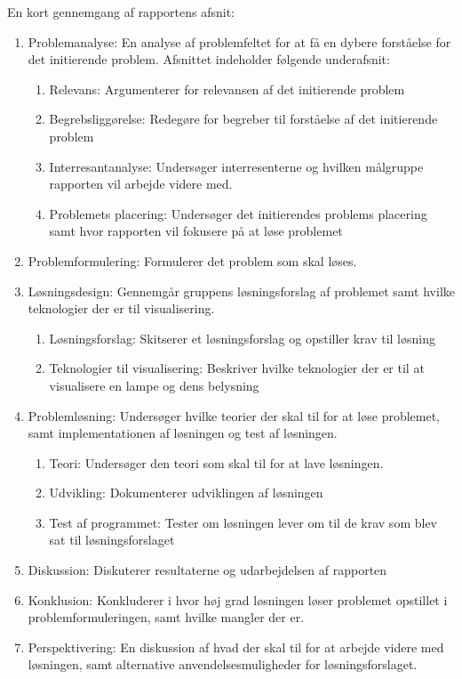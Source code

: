 En kort gennemgang af rapportens afsnit:
\begin{enumerate}
\item Problemanalyse: En analyse af problemfeltet for at få en dybere forståelse for det initierende problem. Afsnittet indeholder følgende underafsnit:
  \begin{enumerate}
    \item Relevans: Argumenterer for relevansen af det initierende problem
    \item Begrebsliggørelse: Redegøre for begreber til forståelse af det initierende problem
    \item Interresantanalyse: Undersøger interresenterne og hvilken målgruppe rapporten vil arbejde videre med.
    \item Problemets placering: Undersøger det initierendes problems placering samt hvor rapporten vil fokusere på at løse problemet
  \end{enumerate}
\item Problemformulering: Formulerer det problem som skal løses.
\item Løsningsdesign: Gennemgår gruppens løsningsforslag af problemet samt hvilke teknologier der er til visualisering.
  \begin{enumerate}
    \item Løsningsforslag: Skitserer et løsningsforslag og opstiller krav til løsning
    \item Teknologier til visualisering: Beskriver hvilke teknologier der er til at visualisere en lampe og dens belysning
  \end{enumerate}
\item Problemløsning: Undersøger hvilke teorier der skal til for at løse problemet, samt implementationen af løsningen og test af løsningen.
  \begin{enumerate}
    \item Teori: Undersøger den teori som skal til for at lave løsningen.
    \item Udvikling: Dokumenterer udviklingen af løsningen
    \item Test af programmet: Tester om løsningen lever om til de krav som blev sat til løsningsforslaget
  \end{enumerate}
\item Diskussion: Diskuterer resultaterne og udarbejdelsen af rapporten
\item Konklusion: Konkluderer i hvor høj grad løsningen løser problemet opstillet i problemformuleringen, samt hvilke mangler der er.
\item Perspektivering: En diskussion af hvad der skal til for at arbejde videre med løsningen, samt alternative anvendelsesmuligheder for løsningsforslaget.
\end{enumerate}


\clearpage